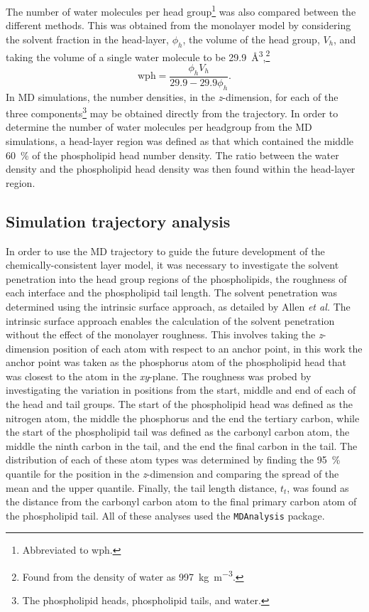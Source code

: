 The number of water molecules per head group\footnote{Abbreviated to wph.} was also compared between the different methods.
This was obtained from the monolayer model by considering the solvent fraction in the head-layer, $\phi_h$, the volume of the head group, $V_h$, and taking the volume of a single water molecule to be \SI{29.9}{\angstrom\cubed},\footnote{Found from the density of water as \SI{997}{\kg\per\meter\cubed}.}
%
\begin{equation}
\text{wph}=\frac{\phi_h V_h}{29.9 - 29.9\phi_h}.
\label{equ:wph}
\end{equation}
%
In MD simulations, the number densities, in the \emph{z}-dimension, for each of the three components\footnote{The phospholipid heads, phospholipid tails, and water.} may be obtained directly from the trajectory.
In order to determine the number of water molecules per headgroup from the MD simulations, a head-layer region was defined as that which contained the middle \SI{60}{\percent} of the phospholipid head number density.
The ratio between the water density and the phospholipid head density was then found within the head-layer region.

\subsection{Simulation trajectory analysis}
\label{sec:traj}
In order to use the MD trajectory to guide the future development of the chemically-consistent layer model, it was necessary to investigate the solvent penetration into the head group regions of the phospholipids, the roughness of each interface and the phospholipid tail length.
The solvent penetration was determined using the intrinsic surface approach, as detailed by Allen \emph{et al.}
The intrinsic surface approach enables the calculation of the solvent penetration without the effect of the monolayer roughness.
This involves taking the \emph{z}-dimension position of each atom with respect to an anchor point, in this work the anchor point was taken as the phosphorus atom of the phospholipid head that was closest to the atom in the \emph{xy}-plane.
The roughness was probed by investigating the variation in positions from the start, middle and end of each of the head and tail groups.
The start of the phospholipid head was defined as the nitrogen atom, the middle the phosphorus and the end the tertiary carbon, while the start of the phospholipid tail was defined as the carbonyl carbon atom, the middle the ninth carbon in the tail, and the end the final carbon in the tail.
The distribution of each of these atom types was determined by finding the \SI{95}{\percent} quantile for the position in the \emph{z}-dimension and comparing the spread of the mean and the upper quantile.
Finally, the tail length distance, $t_t$, was found as the distance from the carbonyl carbon atom to the final primary carbon atom of the phospholipid tail.
All of these analyses used the \texttt{MDAnalysis} package.
